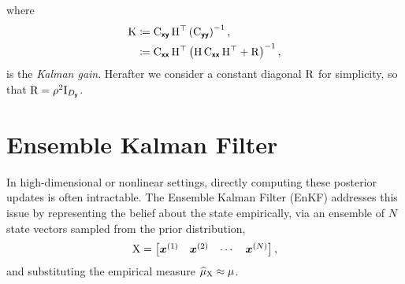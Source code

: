 \documentclass[wcp]{jmlr} %
\begin{document}
where
\begin{align}
\mathrm{K}
&\coloneq \mathrm{C}_{\boldsymbol{\mathsf{xy}}}\,\mathrm{H}^\top \left(\mathrm{C}_{\boldsymbol{\mathsf{yy}}}\right)^{-1},\label{eq:kalman-gain}\\
&\coloneq \mathrm{C}_{\boldsymbol{\mathsf{xx}}}\,\mathrm{H}^\top \left(\mathrm{H}\,\mathrm{C}_{\boldsymbol{\mathsf{xx}}}\,\mathrm{H}^\top + \mathrm{R}\right)^{-1},
\end{align}
is the \emph{Kalman gain}.
Herafter we consider a constant diagonal \(\mathrm{R}\) for simplicity, so that \(\mathrm{R}=\rho^2\mathrm{I}_{D_{\boldsymbol{\mathsf{y}}}}\).

\section{Ensemble Kalman Filter}

In high-dimensional or nonlinear settings, directly computing these posterior updates is often intractable.
The Ensemble Kalman Filter (EnKF) addresses this issue by representing the belief about the state empirically,  via an ensemble of \(N\) state vectors sampled from the prior distribution,
\begin{align}
    \mathrm{X} = \begin{bmatrix} \boldsymbol{x}^{(1)} & \boldsymbol{x}^{(2)} & \cdots & \boldsymbol{x}^{(N)} \end{bmatrix},
\end{align}
and substituting the empirical measure $\ELaw[\mm{X}]\approx \Law$.
\end{document}
